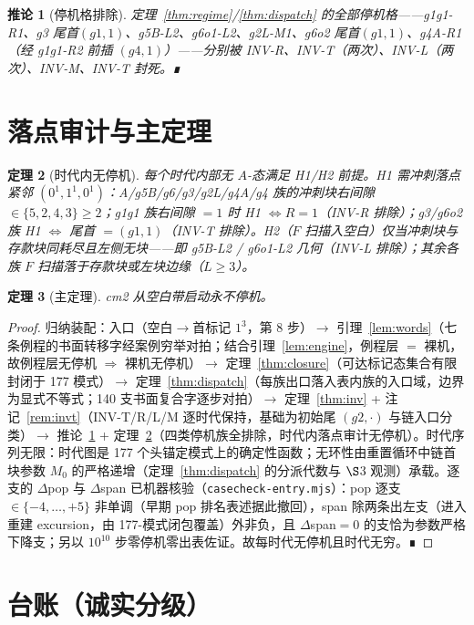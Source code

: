 \documentclass[11pt]{ctexart}
\newtheorem{theorem}{定理}[section]
\newtheorem{corollary}[theorem]{推论}
\theoremstyle{definition}
\begin{document}
\begin{corollary}[停机格排除]\label{cor:halt}
定理~\ref{thm:regime}/\ref{thm:dispatch} 的全部停机格——g1g1-R1、g3 尾首$(g1,1)$、g5B-L2、g6o1-L2、g2L-M1、g6o2 尾首$(g1,1)$、g4A-R1（经 g1g1-R2 前插 $(g4,1)$）——分别被 INV-R、INV-T（两次）、INV-L（两次）、INV-M、INV-T 封死。∎
\end{corollary}

\section{落点审计与主定理}

\begin{theorem}[时代内无停机]\label{thm:S}
每个时代内部无 $A$-态满足 H1/H2 前提。H1 需冲刺落点紧邻 $(0^1,1^1,0^1)$：A/g5B/g6/g3/g2L/g4A/g4 族的冲刺块右间隙 $\in\{5,2,4,3\}\ge2$；g1g1 族右间隙 $=1$ 时 H1 $\iff R{=}1$（INV-R 排除）；g3/g6o2 族 H1 $\iff$ 尾首 $=(g1,1)$（INV-T 排除）。H2（$F$ 扫描入空白）仅当冲刺块与存款块同耗尽且左侧无块——即 g5B-L2 / g6o1-L2 几何（INV-L 排除）；其余各族 $F$ 扫描落于存款块或左块边缘（$L\ge3$）。
\end{theorem}

\begin{theorem}[主定理]\label{thm:main}
cm2 从空白带启动永不停机。
\end{theorem}
\begin{proof}
归纳装配：入口（空白$\to$首标记 $1^3$，第 8 步）$\to$ 引理~\ref{lem:words}（七条例程的书面转移字经案例穷举对拍；结合引理~\ref{lem:engine}，例程层 $=$ 裸机，故例程层无停机 $\Rightarrow$ 裸机无停机）$\to$ 定理~\ref{thm:closure}（可达标记态集合有限封闭于 177 模式）$\to$ 定理~\ref{thm:dispatch}（每族出口落入表内族的入口域，边界为显式不等式；140 支书面复合字逐步对拍）$\to$ 定理~\ref{thm:inv} + 注记~\ref{rem:invt}（INV-T/R/L/M 逐时代保持，基础为初始尾 $(g2,\cdot)$ 与链入口分类）$\to$ 推论~\ref{cor:halt} + 定理~\ref{thm:S}（四类停机族全排除，时代内落点审计无停机）。时代序列无限：时代图是 177 个头锚定模式上的确定性函数；无环性由重置循环中链首块参数 $M_0$ 的严格递增（定理~\ref{thm:dispatch} 的分派代数与 $\S$3 观测）承载。逐支的 $\Delta$pop 与 $\Delta$span 已机器核验（\texttt{casecheck-entry.mjs}）：pop 逐支 $\in\{-4,\dots,+5\}$ 非单调（早期 pop 排名表述据此撤回），span 除两条出左支（进入重建 excursion，由 177-模式闭包覆盖）外非负，且 $\Delta$span$=0$ 的支恰为参数严格下降支；另以 $10^{10}$ 步零停机零出表佐证。故每时代无停机且时代无穷。∎
\end{proof}

\section*{台账（诚实分级）}
\end{document}
